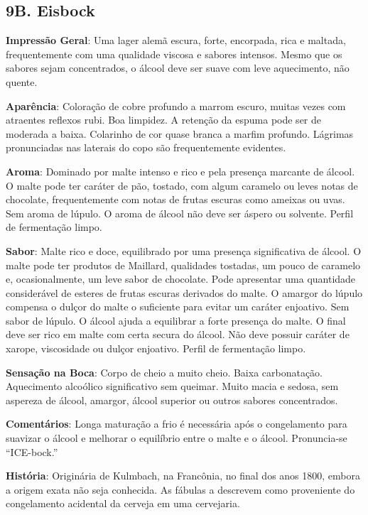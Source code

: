 \subsection*{9B. Eisbock}

\textbf{Impressão Geral}: Uma lager alemã escura, forte, encorpada, rica e maltada, frequentemente com uma qualidade viscosa e sabores intensos. Mesmo que os sabores sejam concentrados, o álcool deve ser suave com leve aquecimento, não quente.

\textbf{Aparência}: Coloração de cobre profundo a marrom escuro, muitas vezes com atraentes reflexos rubi. Boa limpidez. A retenção da espuma pode ser de moderada a baixa. Colarinho de cor quase branca a marfim profundo. Lágrimas pronunciadas nas laterais do copo são frequentemente evidentes.

\textbf{Aroma}: Dominado por malte intenso e rico e pela presença marcante de álcool. O malte pode ter caráter de pão, tostado, com algum caramelo ou leves notas de chocolate, frequentemente com notas de frutas escuras como ameixas ou uvas. Sem aroma de lúpulo. O aroma de álcool não deve ser áspero ou solvente. Perfil de fermentação limpo.

\textbf{Sabor}: Malte rico e doce, equilibrado por uma presença significativa de álcool. O malte pode ter produtos de Maillard, qualidades tostadas, um pouco de caramelo e, ocasionalmente, um leve sabor de chocolate. Pode apresentar uma quantidade considerável de esteres de frutas escuras derivados do malte. O amargor do lúpulo compensa o dulçor do malte o suficiente para evitar um caráter enjoativo. Sem sabor de lúpulo. O álcool ajuda a equilibrar a forte presença do malte. O final deve ser rico em malte com certa secura do álcool. Não deve possuir caráter de xarope, viscosidade ou dulçor enjoativo. Perfil de fermentação limpo.

\textbf{Sensação na Boca}: Corpo de cheio a muito cheio. Baixa carbonatação. Aquecimento alcoólico significativo sem queimar. Muito macia e sedosa, sem aspereza de álcool, amargor, álcool superior ou outros sabores concentrados.

\textbf{Comentários}: Longa maturação a frio é necessária após o congelamento para suavizar o álcool e melhorar o equilíbrio entre o malte e o álcool. Pronuncia-se “ICE-bock.”

\textbf{História}: Originária de Kulmbach, na Francônia, no final dos anos 1800, embora a origem exata não seja conhecida. As fábulas a descrevem como proveniente do congelamento acidental da cerveja em uma cervejaria.


